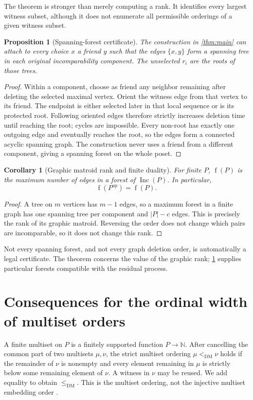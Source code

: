 \documentclass[11pt,letterpaper]{article}
\newtheorem{proposition}[proposition]{Proposition}
\newtheorem{corollary}[corollary]{Corollary}
\theoremstyle{definition}
\theoremstyle{remark}
\newcommand{\fot}{\operatorname{f}}
\newcommand{\Inc}{\operatorname{Inc}}
\newcommand{\DM}{\mathrm{DM}}
\newcommand{\N}{\mathbb N}
\begin{document}
The theorem is stronger than merely computing a rank. It identifies every
largest witness subset, although it does not enumerate all permissible
orderings of a given witness subset.

\begin{proposition}[Spanning-forest certificate]\label{prop:forest}
The construction in \cref{thm:main} can attach to every choice $x$ a friend
$y$ such that the edges $\{x,y\}$ form a spanning tree in each original
incomparability component. The unselected $r_i$ are the roots of those trees.
\end{proposition}
\begin{proof}
Within a component, choose as friend any neighbor remaining after deleting
the selected maximal vertex. Orient the witness edge from that vertex to
its friend. The endpoint is either selected later in that local sequence
or is its protected root. Following oriented edges therefore strictly
increases deletion time until reaching the root; cycles are impossible.
Every non-root has exactly one outgoing edge and eventually reaches the
root, so the edges form a connected acyclic spanning graph. The construction
never uses a friend from a different component, giving a spanning forest
on the whole poset.
\end{proof}

\begin{corollary}[Graphic matroid rank and finite duality]\label{cor:graphic}
For finite $P$, $\fot(P)$ is the maximum number of edges in a forest of
$\Inc(P)$. In particular,
\[
 \fot(P^{\mathrm{op}})=\fot(P).
\]
\end{corollary}
\begin{proof}
A tree on $m$ vertices has $m-1$ edges, so a maximum forest in a finite graph
has one spanning tree per component and $|P|-c$ edges. This is precisely
the rank of its graphic matroid. Reversing the order does not change which
pairs are incomparable, so it does not change this rank.
\end{proof}

Not every spanning forest, and not every graph deletion order, is automatically
a legal certificate. The theorem concerns the value of the graphic rank;
\cref{prop:forest} supplies particular forests compatible with the residual
process.

\section{Consequences for the ordinal width of multiset orders}
\label{sec:multisets}
A finite multiset on $P$ is a finitely supported function $P\to\N$.
After cancelling the common part of two multisets $\mu,\nu$, the strict
multiset ordering $\mu<_{\DM}\nu$ holds if the remainder of $\nu$ is
nonempty and every element remaining in $\mu$ is strictly below some
remaining element of $\nu$. A witness in $\nu$ may be reused. We add equality
to obtain $\leq_{\DM}$. This is the multiset ordering, not the injective
multiset embedding order \cite[Section~1]{VialardMFCS}.
\end{document}
